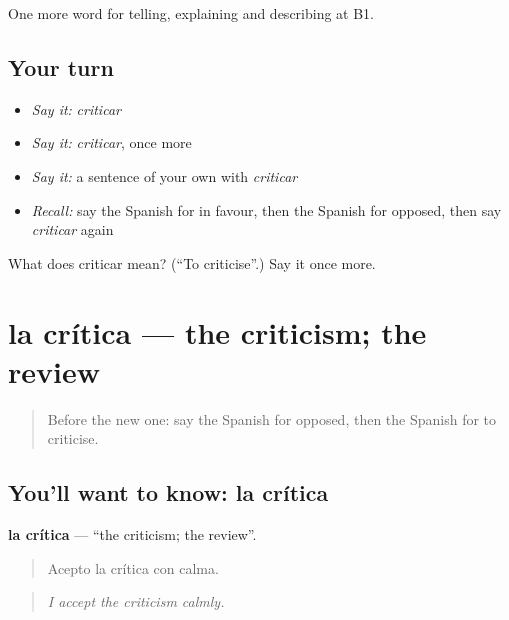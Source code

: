 \begin{grammarlens}[title={What you've built}]
One more word for telling, explaining and describing at B1.
\end{grammarlens}

\subsection*{Your turn}
\begin{itemize}
\raggedright
  \item \emph{Say it:} \emph{criticar}
  \item \emph{Say it:} \emph{criticar}, once more
  \item \emph{Say it:} a sentence of your own with \emph{criticar}
  \item \emph{Recall:} say the Spanish for in favour, then the Spanish for opposed, then say \emph{criticar} again
\end{itemize}

\begin{tcolorbox}[breakable,colback=teal!4,colframe=teal!35!black,title={Before you move on}]
What does criticar mean? (\textquotedblleft{}To criticise\textquotedblright{}.) Say it once more.
\end{tcolorbox}
\section[la crítica]{la crítica — the criticism; the review}

\label{lesson:ES-C579-critica}



\begin{quote}
Before the new one: say the Spanish for opposed, then the Spanish for to criticise.
\end{quote}

\subsection*{You'll want to know: la crítica}
\textbf{la crítica} — \textquotedblleft{}the criticism; the review\textquotedblright{}.

\begin{quote}
Acepto la crítica con calma.
\end{quote}

\begin{quote}
\emph{I accept the criticism calmly.}
\end{quote}

